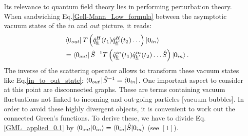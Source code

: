 \documentclass[
12pt, %
english, %
singlespacing, %
headsepline, %
]{MastersDoctoralThesis} %
\begin{document}
Its relevance to quantum field theory lies in performing perturbation theory. When sandwiching Eq.\enskip\eqref{Gell-Mann_Low_formula} between the asymptotic vacuum states of the $ in $ and $ out $ picture, it reads:
\begin{equation}\label{GML_applied_0.1}
\begin{split}
&\bra{0_{out}}
T\left( 
\hat{q}^{H}_{\underline{k}}(t_1)
\hat{q}^{H}_{\underline{k}^{\prime}}(t_2)
\ldots
\right) 
\ket{0_{in}}
\\
&=
\bra{0_{out}}
\hat{S}^{-1}
T\left( 
\hat{q}^{in}_{\underline{k}}(t_1)
\hat{q}^{in}_{\underline{k}^{\prime}}(t_2)
\ldots
\hat{S}
\right)
\ket{0_{in}}
.
\end{split}
\end{equation}
The inverse of the scattering operator allows to transform these vacuum states like Eq.\enskip\eqref{in_to_out_state}: $\bra{0_{out}}\hat{S}^{-1}=\bra{0_{in}}$. One important aspect to consider at this point are disconnected graphs. These are terms containing vacuum fluctuations not linked to incoming and out-going particles [vacuum bubbles]. In order to avoid these highly divergent objects, it is convenient to work out the connected Green's functions. To derive these, we have to divide Eq.\enskip\eqref{GML_applied_0.1} by $ \braket{0_{out}|0_{in}} = \braket{0_{in}|\hat{S}|0_{in}} $ (see $ [1]$).
\newpage
\end{document}
